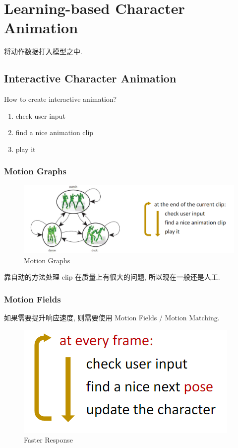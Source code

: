 \newpage
\section{Learning-based Character Animation}
将动作数据打入模型之中.
\subsection{Interactive Character Animation}

How to create interactive animation?
\begin{enumerate}
    \item check user input
    \item find a nice animation clip
    \item play it
\end{enumerate}


\subsubsection{Motion Graphs}

\begin{figure}[!htb]
    \centering
    \includegraphics[width=0.88\linewidth]{pic/1056/Motion Graphs}
    \caption{Motion Graphs}
\end{figure}

靠自动的方法处理 clip 在质量上有很大的问题, 所以现在一般还是人工.


\subsubsection{Motion Fields}
如果需要提升响应速度, 则需要使用 Motion Fields / Motion Matching.

\begin{figure}[!htb]
    \centering
    \includegraphics[width=0.42\linewidth]{pic/1056/Faster Response}
    \caption{Faster Response}
\end{figure}

